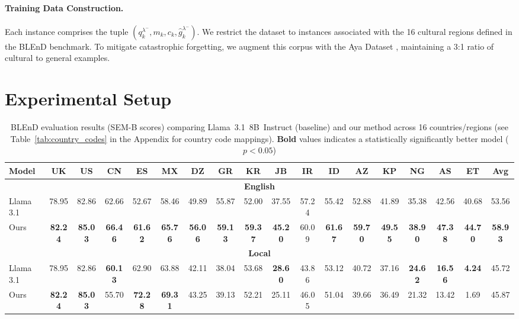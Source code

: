 \documentclass[11pt]{article}
\begin{document}
\paragraph{Training Data Construction.} Each instance comprises the tuple $(q_k^{\lambda^{-}}, m_k, c_k, \hat{g}_k^{\lambda^{-}})$. We restrict the dataset to instances associated with the 16 cultural regions defined in the BLEnD benchmark. To mitigate catastrophic forgetting, we augment this corpus with the Aya Dataset \cite{singh-etal-2024-aya}, maintaining a 3:1 ratio of cultural to general examples.

\section{Experimental Setup}

\begin{table}[t]
\centering
\footnotesize
\setlength{\tabcolsep}{1.5pt}
\begin{tabular}{l|cccccccccccccccc|c}
\hline
\textbf{Model} & \textbf{UK} & \textbf{US} & \textbf{CN} & \textbf{ES} & \textbf{MX} & \textbf{DZ} & \textbf{GR} & \textbf{KR} & \textbf{JB} & \textbf{IR} & \textbf{ID} & \textbf{AZ} & \textbf{KP} & \textbf{NG} & \textbf{AS} & \textbf{ET} & \textbf{Avg} \\
\hline
\multicolumn{18}{c}{\textbf{English}} \\
\hline
Llama 3.1 & 78.95 & 82.86 & 62.66 & 52.67 & 58.46 & 49.89 & 55.87 & 52.00 & 37.55 & 57.24 & 55.42 & 52.88 & 41.89 & 35.38 & 42.56 & 40.68 & 53.56 \\
Ours & \textbf{82.24} & \textbf{85.03} & \textbf{66.46} & \textbf{61.62} & \textbf{65.76} & \textbf{56.06} & \textbf{59.13} & \textbf{59.37} & \textbf{45.20} & 60.09 & \textbf{61.67} & \textbf{59.70} & \textbf{49.55} & \textbf{38.90} & \textbf{47.38} & \textbf{44.70} & \textbf{58.93} \\
\hline
\multicolumn{18}{c}{\textbf{Local}} \\
\hline
Llama 3.1 & 78.95 & 82.86 & \textbf{60.13} & 62.90 & 63.88 & 42.11 & 38.04 & 53.68 & \textbf{28.60} & 43.86 & 53.12 & 40.72 & 37.16 & \textbf{24.62} & \textbf{16.56} & \textbf{4.24} & 45.72 \\
Ours & \textbf{82.24} & \textbf{85.03} & 55.70 & \textbf{72.28} & \textbf{69.31} & 43.25 & 39.13 & 52.21 & 25.11 & 46.05 & 51.04 & 39.66 & 36.49 & 21.32 & 13.42 & 1.69 & 45.87 \\
\hline
\end{tabular}
\caption{BLEnD evaluation results (SEM-B scores) comparing Llama~3.1~8B~Instruct (baseline) and our method across 16 countries/regions (see Table~\ref{tab:country_codes} in the Appendix for country code mappings). \textbf{Bold} values indicates a statistically significantly better model ($p < 0.05$)}
\label{tab:blend_results}
\end{table}
\end{document}
